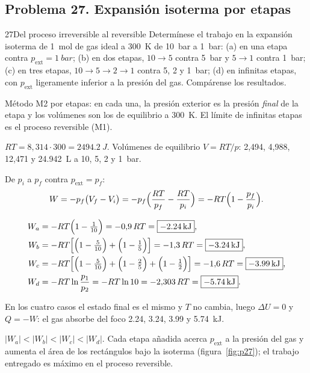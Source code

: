 \subsection{Problema 27. Expansión isoterma por etapas}
\begin{problema}{27}{Del proceso irreversible al reversible}
Determínese el trabajo en la expansión isoterma de \SI{1}{mol} de gas ideal a \SI{300}{K} de \SI{10}{bar} a
\SI{1}{bar}: (a) en una etapa contra $p_{\mathrm{ext}}=\SI{1}{bar}$; (b) en dos etapas, $10\to5$ contra \SI{5}{bar} y
$5\to1$ contra \SI{1}{bar}; (c) en tres etapas, $10\to5\to2\to1$ contra 5, 2 y \SI{1}{bar}; (d) en infinitas etapas,
con $p_{\mathrm{ext}}$ ligeramente inferior a la presión del gas. Compárense los resultados.
\end{problema}

\begin{resolucion}
\idea Método M2 por etapas: en cada una, la presión exterior es la presión \emph{final} de la etapa y los
volúmenes son los de equilibrio a \SI{300}{K}. El límite de infinitas etapas es el proceso reversible (M1).

 $RT=8{,}314\cdot300=\SI{2494,2}{J}$. Volúmenes de equilibrio $V=RT/p$: 2,494, 4,988,
12,471 y \SI{24,942}{L} a 10, 5, 2 y \SI{1}{bar}.

 De $p_i$ a $p_f$ contra $p_{\mathrm{ext}}=p_f$:
\[
  W=-p_f\bigl(V_f-V_i\bigr)=-p_f\Bigl(\frac{RT}{p_f}-\frac{RT}{p_i}\Bigr)=-RT\Bigl(1-\frac{p_f}{p_i}\Bigr).
\]

\begin{align*}
  W_a&=-RT\Bigl(1-\tfrac{1}{10}\Bigr)=-0{,}9\,RT=\boxed{-\SI{2,24}{kJ}},\\
  W_b&=-RT\Bigl[\Bigl(1-\tfrac{5}{10}\Bigr)+\Bigl(1-\tfrac15\Bigr)\Bigr]=-1{,}3\,RT=\boxed{-\SI{3,24}{kJ}},\\
  W_c&=-RT\Bigl[\Bigl(1-\tfrac{5}{10}\Bigr)+\Bigl(1-\tfrac25\Bigr)+\Bigl(1-\tfrac12\Bigr)\Bigr]=-1{,}6\,RT=\boxed{-\SI{3,99}{kJ}},\\
  W_d&=-RT\ln\frac{p_1}{p_2}=-RT\ln10=-2{,}303\,RT=\boxed{-\SI{5,74}{kJ}}.
\end{align*}

 En los cuatro casos el estado final es el mismo y $T$ no cambia, luego $\Delta U=0$ y
$Q=-W$: el gas absorbe del foco \num{2,24}, \num{3,24}, \num{3,99} y \SI{5,74}{kJ}.

 $|W_a|<|W_b|<|W_c|<|W_d|$. Cada etapa añadida acerca $p_{\mathrm{ext}}$ a la presión del gas y
aumenta el área de los rectángulos bajo la isoterma (figura~\ref{fig:p27}); el trabajo entregado es máximo en el
proceso reversible.
\end{resolucion}

